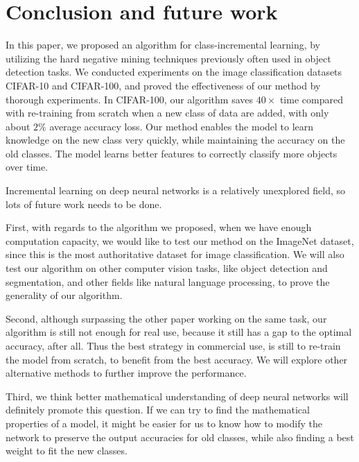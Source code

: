 

\chapter{Conclusion and future work}

In this paper, we proposed an algorithm for class-incremental learning, by utilizing the hard negative mining techniques previously often used in object detection tasks. We conducted experiments on the image classification datasets CIFAR-10 and CIFAR-100, and proved the effectiveness of our method by thorough experiments. In CIFAR-100, our algorithm saves $40\times$ time compared with re-training from scratch when a new class of data are added, with only about $2\%$ average accuracy loss. Our method enables the model to learn knowledge on the new class very quickly, while maintaining the accuracy on the old classes. The model learns better features to correctly classify more objects over time.

Incremental learning on deep neural networks is a relatively unexplored field, so lots of future work needs to be done. 

First, with regards to the algorithm we proposed, when we have enough computation capacity, we would like to test our method on the ImageNet dataset, since this is the most authoritative dataset for image classification. We will also test our algorithm on other computer vision tasks, like object detection and segmentation, and other fields like natural language processing, to prove the generality of our algorithm.

Second, although surpassing the other paper working on the same task, our algorithm is still not enough for real use, because it still has a gap to the optimal accuracy, after all. Thus the best strategy in commercial use, is still to re-train the model from scratch, to benefit from the best accuracy. We will explore other alternative methods to further improve the performance. 

Third, we think better mathematical understanding of deep neural networks will definitely promote this question. If we can try to find the mathematical properties of a model, it might be easier for us to know how to modify the network to preserve the output accuracies for old classes, while also finding a best weight to fit the new classes.

